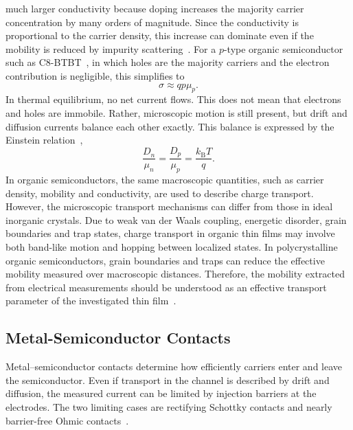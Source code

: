 much larger conductivity because doping increases the majority carrier
concentration by many orders of magnitude. Since the conductivity is
proportional to the carrier density, this increase can dominate even if the
mobility is reduced by impurity scattering~\cite{Neamen}. For a $p$-type
organic semiconductor such as C8-BTBT~\cite{Bruetting2005}, in which holes are
the majority carriers and the electron contribution is negligible, this
simplifies to
\begin{equation}
    \sigma \approx q p \mu_p .
\end{equation}
In thermal equilibrium, no net current flows. This does not mean that electrons
and holes are immobile. Rather, microscopic motion is still present, but drift
and diffusion currents balance each other exactly. This balance is expressed by
the Einstein relation~\cite{Neamen},
\begin{equation}
    \frac{D_n}{\mu_n} = \frac{D_p}{\mu_p}
    = \frac{k_\mathrm{B}T}{q}.
\end{equation}
In organic semiconductors, the same macroscopic quantities, such as carrier
density, mobility and conductivity, are used to describe charge transport.
However, the microscopic transport mechanisms can differ from those in ideal
inorganic crystals. Due to weak van der Waals coupling, energetic disorder,
grain boundaries and trap states, charge transport in organic thin films may
involve both band-like motion and hopping between localized states. In
polycrystalline organic semiconductors, grain boundaries and traps can reduce
the effective mobility measured over macroscopic distances. Therefore, the
mobility extracted from electrical measurements should be understood as an
effective transport parameter of the investigated thin film~\cite{Bruetting2005}.



\subsection{Metal-Semiconductor Contacts}

Metal--semiconductor contacts determine how efficiently carriers enter and leave
the semiconductor. Even if transport in the channel is described by drift and
diffusion, the measured current can be limited by injection barriers at the
electrodes. The two limiting cases are rectifying Schottky contacts and nearly
barrier-free Ohmic contacts~\cite{Neamen,ElKareh2015RectifyingOhmicContacts}.

